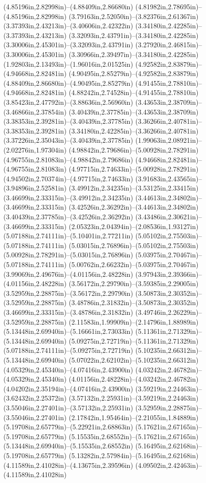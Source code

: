 (4.85196in,2.82998in)--(4.88409in,2.86680in) (4.81982in,2.78695in)--(4.85196in,2.82998in) (3.79163in,2.52050in)--(3.82376in,2.61367in) (3.37393in,2.43213in)--(3.40606in,2.42322in) (3.34180in,2.42285in)--(3.37393in,2.43213in) (3.32093in,2.43791in)--(3.34180in,2.42285in) (3.30006in,2.45301in)--(3.32093in,2.43791in) (3.27920in,2.46815in)--(3.30006in,2.45301in) (3.30966in,2.39497in)--(3.34180in,2.42285in) (1.92803in,2.13493in)--(1.96016in,2.01525in) (4.92582in,2.83879in)--(4.94668in,2.82481in) (4.90495in,2.85279in)--(4.92582in,2.83879in) (4.88409in,2.86680in)--(4.90495in,2.85279in) (4.91455in,2.78810in)--(4.94668in,2.82481in) (4.88242in,2.74528in)--(4.91455in,2.78810in) (3.85423in,2.47792in)--(3.88636in,2.56960in) (3.43653in,2.38709in)--(3.46866in,2.37854in) (3.40439in,2.37785in)--(3.43653in,2.38709in) (3.38353in,2.39281in)--(3.40439in,2.37785in) (3.36266in,2.40781in)--(3.38353in,2.39281in) (3.34180in,2.42285in)--(3.36266in,2.40781in) (3.37226in,2.35043in)--(3.40439in,2.37785in) (1.99063in,2.08921in)--(2.02276in,1.97304in) (4.98842in,2.79686in)--(5.00928in,2.78291in) (4.96755in,2.81083in)--(4.98842in,2.79686in) (4.94668in,2.82481in)--(4.96755in,2.81083in) (4.97715in,2.74633in)--(5.00928in,2.78291in) (4.94502in,2.70374in)--(4.97715in,2.74633in) (3.91683in,2.43565in)--(3.94896in,2.52581in) (3.49912in,2.34235in)--(3.53125in,2.33415in) (3.46699in,2.33315in)--(3.49912in,2.34235in) (3.44613in,2.34802in)--(3.46699in,2.33315in) (3.42526in,2.36292in)--(3.44613in,2.34802in) (3.40439in,2.37785in)--(3.42526in,2.36292in) (3.43486in,2.30621in)--(3.46699in,2.33315in) (2.05323in,2.04394in)--(2.08536in,1.93127in) (5.07188in,2.74111in)--(5.10401in,2.77211in) (5.05102in,2.75503in)--(5.07188in,2.74111in) (5.03015in,2.76896in)--(5.05102in,2.75503in) (5.00928in,2.78291in)--(5.03015in,2.76896in) (5.03975in,2.70467in)--(5.07188in,2.74111in) (5.00762in,2.66232in)--(5.03975in,2.70467in) (3.99069in,2.49676in)--(4.01156in,2.48228in) (3.97943in,2.39366in)--(4.01156in,2.48228in) (3.56172in,2.29790in)--(3.59385in,2.29005in) (3.52959in,2.28875in)--(3.56172in,2.29790in) (3.50873in,2.30352in)--(3.52959in,2.28875in) (3.48786in,2.31832in)--(3.50873in,2.30352in) (3.46699in,2.33315in)--(3.48786in,2.31832in) (3.49746in,2.26229in)--(3.52959in,2.28875in) (2.11583in,1.99909in)--(2.14796in,1.88989in) (5.13448in,2.69940in)--(5.16661in,2.73033in) (5.11361in,2.71329in)--(5.13448in,2.69940in) (5.09275in,2.72719in)--(5.11361in,2.71329in) (5.07188in,2.74111in)--(5.09275in,2.72719in) (5.10235in,2.66312in)--(5.13448in,2.69940in) (5.07022in,2.62102in)--(5.10235in,2.66312in) (4.05329in,2.45340in)--(4.07416in,2.43900in) (4.03242in,2.46782in)--(4.05329in,2.45340in) (4.01156in,2.48228in)--(4.03242in,2.46782in) (4.04202in,2.35194in)--(4.07416in,2.43900in) (3.59219in,2.24463in)--(3.62432in,2.25372in) (3.57132in,2.25931in)--(3.59219in,2.24463in) (3.55046in,2.27401in)--(3.57132in,2.25931in) (3.52959in,2.28875in)--(3.55046in,2.27401in) (2.17842in,1.95464in)--(2.21055in,1.84889in) (5.19708in,2.65779in)--(5.22921in,2.68863in) (5.17621in,2.67165in)--(5.19708in,2.65779in) (5.15535in,2.68552in)--(5.17621in,2.67165in) (5.13448in,2.69940in)--(5.15535in,2.68552in) (5.16495in,2.62168in)--(5.19708in,2.65779in) (5.13282in,2.57984in)--(5.16495in,2.62168in) (4.11589in,2.41028in)--(4.13675in,2.39596in) (4.09502in,2.42463in)--(4.11589in,2.41028in) 